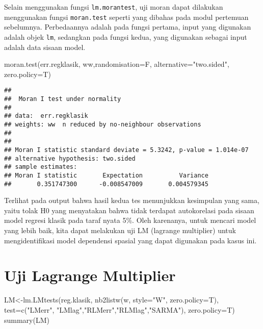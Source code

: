\documentclass[
]{book}
\newenvironment{Shaded}{\begin{snugshade}}{\end{snugshade}}
\newcommand{\AttributeTok}[1]{\textcolor[rgb]{0.77,0.63,0.00}{#1}}
\newcommand{\FunctionTok}[1]{\textcolor[rgb]{0.00,0.00,0.00}{#1}}
\newcommand{\NormalTok}[1]{#1}
\newcommand{\OtherTok}[1]{\textcolor[rgb]{0.56,0.35,0.01}{#1}}
\newcommand{\StringTok}[1]{\textcolor[rgb]{0.31,0.60,0.02}{#1}}
\begin{document}
Selain menggunakan fungsi \texttt{lm.morantest}, uji moran dapat dilakukan menggunakan fungsi \texttt{moran.test} seperti yang dibahas pada modul pertemuan sebelumnya. Perbedaannya adalah pada fungsi pertama, input yang digunakan adalah objek \texttt{lm}, sedangkan pada fungsi kedua, yang digunakan sebagai input adalah data sisaan model.

\begin{Shaded}
\begin{Highlighting}[]
\FunctionTok{moran.test}\NormalTok{(err.regklasik, ww,}\AttributeTok{randomisation=}\NormalTok{F, }\AttributeTok{alternative=}\StringTok{"two.sided"}\NormalTok{, }\AttributeTok{zero.policy=}\NormalTok{T)}
\end{Highlighting}
\end{Shaded}

\begin{verbatim}
## 
##  Moran I test under normality
## 
## data:  err.regklasik  
## weights: ww  n reduced by no-neighbour observations
##   
## 
## Moran I statistic standard deviate = 5.3242, p-value = 1.014e-07
## alternative hypothesis: two.sided
## sample estimates:
## Moran I statistic       Expectation          Variance 
##       0.351747300      -0.008547009       0.004579345
\end{verbatim}

Terlihat pada output bahwa hasil kedua tes menunjukkan kesimpulan yang sama, yaitu tolak H0 yang menyatakan bahwa tidak terdapat autokorelasi pada sisaan model regresi klasik pada taraf nyata 5\%. Oleh karenanya, untuk mencari model yang lebih baik, kita dapat melakukan uji LM (lagrange multiplier) untuk mengidentifikasi model dependensi spasial yang dapat digunakan pada kasus ini.

\hypertarget{uji-lagrange-multiplier}{%
\section{Uji Lagrange Multiplier}\label{uji-lagrange-multiplier}}

\begin{Shaded}
\begin{Highlighting}[]
\NormalTok{LM}\OtherTok{\textless{}{-}}\FunctionTok{lm.LMtests}\NormalTok{(reg.klasik, }\FunctionTok{nb2listw}\NormalTok{(w, }\AttributeTok{style=}\StringTok{"W"}\NormalTok{, }\AttributeTok{zero.policy=}\NormalTok{T),}
               \AttributeTok{test=}\FunctionTok{c}\NormalTok{(}\StringTok{"LMerr"}\NormalTok{, }\StringTok{"LMlag"}\NormalTok{,}\StringTok{"RLMerr"}\NormalTok{,}\StringTok{"RLMlag"}\NormalTok{,}\StringTok{"SARMA"}\NormalTok{), }\AttributeTok{zero.policy=}\NormalTok{T)}
\FunctionTok{summary}\NormalTok{(LM)}
\end{Highlighting}
\end{Shaded}
\end{document}
